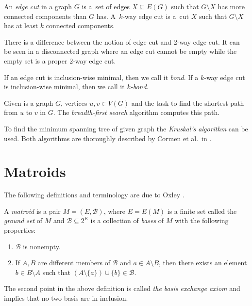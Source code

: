 \pagebreak

An \textit{edge cut} in a graph $G$ is a~set of edges $X \subseteq E(G)$ such that $G \setminus X$ has more connected components than $G$ has. A~$k$-way edge cut is a~cut $X$ such that $G \setminus X$ has at least $k$ connected components.

\begin{note}
	There is a difference between the notion of edge cut and 2-way edge cut. It can be seen in a disconnected graph where an edge cut cannot be empty while the empty set is a proper $2$-way edge cut.
\end{note}

If an edge cut is inclusion-wise minimal, then we call it \textit{bond}. If a $k$-way edge cut is inclusion-wise minimal, then we call it \textit{$k$-bond}.

Given is a graph $G$, vertices $u, v \in V(G)$ and the task to find the shortest path from $u$ to $v$ in $G$. The \textit{breadth-first search} algorithm computes this path.

To find the minimum spanning tree of given graph the \textit{Kruskal's algorithm} can be used. Both algorithms are thoroughly described by Cormen et al.\ in \cite{clrs}.

\section{Matroids}
The following definitions and terminology are due to Oxley \cite{oxley2006matroid}.

\begin{defn}[Matroid]
	A \textit{matroid} is a pair $M = (E,\mathcal{B})$, where $E = E(M)$ is a finite set called the \textit{ground set} of $M$ and $\mathcal{B} \subseteq 2^{E}$ is a collection of \textit{bases} of $M$ with the following properties:
	\begin{enumerate}
		\item $\mathcal{B}$ is nonempty.
		\item If $A, B$ are different members of $\mathcal{B}$ and $a \in A \setminus B$, then there exists an element $b \in B \setminus A$ such that $(A \setminus \{a\}) \cup \{b\} \in \mathcal{B}$.
	\end{enumerate}
\end{defn}

\begin{rem}
The second point in the above definition is called \textit{the basis exchange axiom} and implies that no two basis are in inclusion.
\end{rem}

